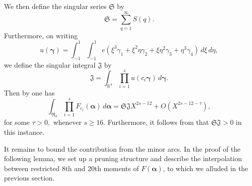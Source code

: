 \documentclass{amsart}%
\numberwithin{equation}{section}
\theoremstyle{remark}
\newcommand{\R}{\mathbb{R}}
\newcommand{\1}{\mathbbm{1}}
\newcommand{\balp}{\boldsymbol{\alpha}}
\begin{document}
We then define the singular series $\mathfrak{S}$ by
\begin{equation*}
    \mathfrak{S}=\sum_{q=1}^{\infty}S(q).
\end{equation*}
Furthermore, on writing
\begin{equation*}
u(\boldsymbol{\gamma})=\int_{-1}^1\int_{-1}^1e(\xi^3\gamma_1+\xi^{2}\eta\gamma_2+ \xi\eta^{2}\gamma_3+\eta^3\gamma_{4}) \,d\xi \, d\eta,
\end{equation*}
we define the singular integral $\mathfrak{J}$ by
\begin{equation*}
\mathfrak{J}=\int_{\R^{4}}\prod_{i=1}^su(c_i\boldsymbol{\gamma}) \, d\boldsymbol{\gamma}.
\end{equation*}
 Then by \cite[Lemma 2.1]{ky2026} one has
 \begin{equation}\label{major}
\int_{\mathfrak{N}_{\delta}} \prod_{i=1}^sF_{c_i}(\boldsymbol{\alpha})\, d\boldsymbol{\alpha} = \mathfrak{S}\mathfrak{J}X^{2s-12}+O(X^{2s-12-\tau}),
    \end{equation}
    for some $\tau>0,$ whenever $s \ge 16$. Furthermore, it follows from \cite[Lemma 5.1]{MR1778504}
that $\mathfrak{S}\mathfrak{J} > 0$ in this instance. 

It remains to bound the contribution from the minor arcs. In the proof of the following lemma, we set up a pruning structure and describe the interpolation between restricted 8th and 20th moments of $F(\balp)$, to which we alluded in the previous section.
\end{document}
